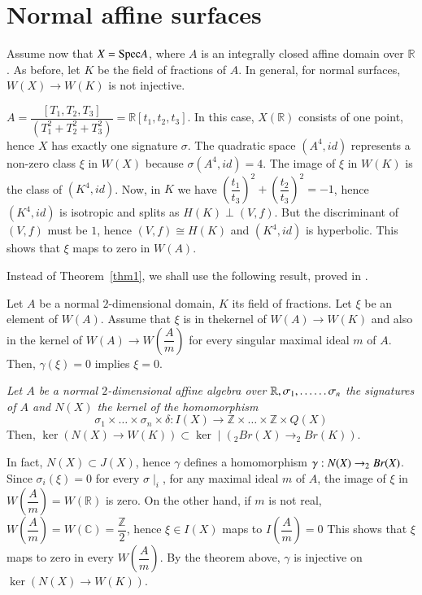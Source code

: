 \section{Normal affine surfaces}\label{s4}

Assume now that $X=\mathrm{Spec} A$, where $A$ is an integrally closed affine domain over $\mathbb{R}$. As before, let $K$ be the field of fractions of $A$. In general, for normal surfaces, $W(X)\to W(K)$ is not injective.

\begin{EXP}
$A=\dfrac{[T_1,T_2,T_3]}{\left(T^{2}_1+T^{2}_2+T^{2}_3\right)}=\mathbb{R}[t_1,t_2,t_3]$. In this case, $X(\mathbb{R})$ consists of one point, hence $X$ has exactly one signature $\sigma$. The quadratic space $(A^{4}, id)$ represents a non-zero class $\xi$ in $W(X)$ because $\sigma(A^{4},id)=4$. The image of $\xi$ in $W(K)$ is the class of $\left(K^{4},id\right)$. Now, in $K$ we have $\left(\dfrac{t_1}{t_3}\right)^{2}+ \left(\dfrac{t_2}{t_3}\right)^{2}=-1$, hence $\left(K^{4},id\right)$ is isotropic and splits as $H(K)\perp(V,f)$. But the discriminant of $(V,f)$ must be $1$, hence $(V,f)\cong H(K)$ and $\left(K^{4},id\right)$ is hyperbolic. This shows that $\xi$ maps to zero in $W(A)$. 

Instead of Theorem~\ref{thm1}, we shall use the following result, proved in \cite{key13}. 
\end{EXP}

\begin{thm}\label{thm3}
Let $A$ be a normal $2$-dimensional domain, $K$ its field of fractions. Let $\xi$ be an element of $W(A)$. Assume that $\xi$ is in the\pageoriginale kernel of $W(A)\to W(K)$ and also in the kernel of $W(A)\to W\left(\dfrac{A}{m}\right)$ for every singular maximal ideal $m$ of $A$. Then, $\gamma(\xi)=0$ implies $\xi=0$. 
\end{thm}

\begin{corr}
\textit{Let $A$ be a normal $2$-dimensional affine algebra over $\mathbb{R},\\\sigma_1,\ldots\ldots \sigma_n$ the signatures of $A$ and $N(X)$ the kernel of the homomorphism }
$$
\sigma_1\times\ldots \times\sigma_n\times \delta:I(X)\to \mathbb{Z}\times\ldots\times \mathbb{Z}\times Q(X)
$$
Then, $\ker(N(X)\to W(K))\subset\ker \mid (_2Br(X)\to _2Br(K))$. 
\end{corr}

In fact, $N(X)\subset J(X)$, hence $\gamma$ defines a homomorphism $\gamma:\\N(X)\to_2 Br(X)$. Since $\sigma_i(\xi)=0$ for every $\sigma\mid_i$, for any maximal ideal $m$ of $A$, the image of $\xi$ in $W\left(\dfrac{A}{m}\right)=W(\mathbb{R})$ is zero. On the other hand, if $m$ is not real, $W\left(\dfrac{A}{m}\right)=W(\mathbb{C})=\dfrac{\mathbb{Z}}{2}$, hence $\xi\in I(X)$ maps to $I\left(\dfrac{A}{m}\right)=0$ This shows that $\xi$ maps to zero in every $W\left(\dfrac{A}{m}\right)$. By the theorem above, $\gamma$ is injective on $\ker(N(X)\to W(K))$. 

